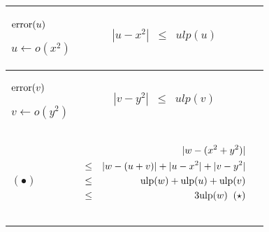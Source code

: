 \documentclass[12pt]{amsart}
\def\minf{\bigtriangledown}
\def\ulp{{\rm ulp}}
\begin{document}
\begin{center}
\begin{tabular}{l|l |l}

\begin{minipage}{2.5cm}


${\textnormal{error}}(u)$


$u \leftarrow o(x^2)$

\end{minipage} &
\begin{minipage}{7.5cm}

\begin{eqnarray}\nonumber
  |u-x^2| &\leq& ulp(u)\\\nonumber
\end{eqnarray}

\end{minipage} &
\begin{minipage}{6cm}
{\hspace{7cm}}
\end{minipage}\\\hline
\begin{minipage}{2.5cm}
${\textnormal{error}}(v)$


$v \leftarrow o({y}^{2}) $

\end{minipage} &
\begin{minipage}{7.5cm}

\begin{eqnarray}\nonumber
  |v-y^2| &\leq& ulp(v)\\\nonumber
\end{eqnarray}


\end{minipage} &
\begin{minipage}{6cm}


\end{minipage}\\\hline
\begin{minipage}{2.5cm}
${\textnormal{error}}(w)$


$w \leftarrow \minf(u+v) $\\
$(\bullet)$
\end{minipage} &
\begin{minipage}{7.8cm}



\begin{eqnarray}\nonumber
  &&|w-(x^2+y^2)| \\\nonumber
  &       \leq&  |w - (u+v)|+|u - x^2|+|v - y^2|\\\nonumber
  &       \leq& \ulp(w) + \ulp(u) + \ulp(v)\\\nonumber
  &       \leq& 3\ulp(w)\;\;(\star)\\\nonumber
\end{eqnarray}



\end{minipage}
\end{tabular}
\end{center}
\end{document}
